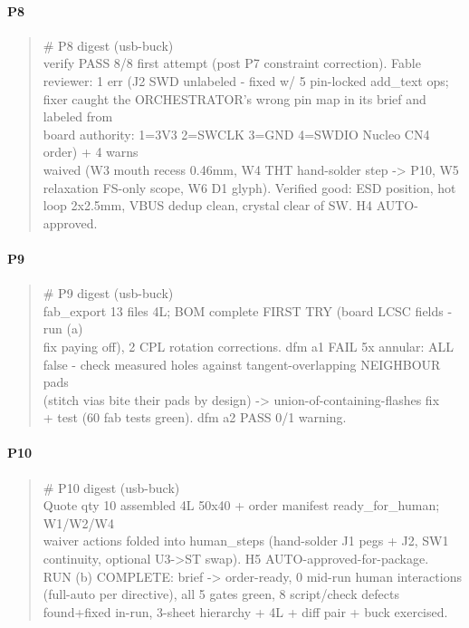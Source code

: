 \documentclass[11pt,a4paper]{article}
\begin{document}
\paragraph*{P8}
\begin{quote}\small\ttfamily\raggedright
\# P8 digest (usb-buck)\\
verify PASS 8/8 first attempt (post P7 constraint correction). Fable\\
reviewer: 1 err (J2 SWD unlabeled - fixed w/ 5 pin-locked add\_text ops;\\
fixer caught the ORCHESTRATOR's wrong pin map in its brief and labeled from\\
board authority: 1=3V3 2=SWCLK 3=GND 4=SWDIO Nucleo CN4 order) + 4 warns\\
waived (W3 mouth recess 0.46mm, W4 THT hand-solder step -\textgreater{} P10, W5\\
relaxation FS-only scope, W6 D1 glyph). Verified good: ESD position, hot\\
loop 2x2.5mm, VBUS dedup clean, crystal clear of SW. H4 AUTO-approved.
\end{quote}
\paragraph*{P9}
\begin{quote}\small\ttfamily\raggedright
\# P9 digest (usb-buck)\\
fab\_export 13 files 4L; BOM complete FIRST TRY (board LCSC fields - run (a)\\
fix paying off), 2 CPL rotation corrections. dfm a1 FAIL 5x annular: ALL\\
false - check measured holes against tangent-overlapping NEIGHBOUR pads\\
(stitch vias bite their pads by design) -\textgreater{} union-of-containing-flashes fix\\
+ test (60 fab tests green). dfm a2 PASS 0/1 warning.
\end{quote}
\paragraph*{P10}
\begin{quote}\small\ttfamily\raggedright
\# P10 digest (usb-buck)\\
Quote qty 10 assembled 4L 50x40 + order manifest ready\_for\_human; W1/W2/W4\\
waiver actions folded into human\_steps (hand-solder J1 pegs + J2, SW1\\
continuity, optional U3-\textgreater{}ST swap). H5 AUTO-approved-for-package.\\
RUN (b) COMPLETE: brief -\textgreater{} order-ready, 0 mid-run human interactions\\
(full-auto per directive), all 5 gates green, 8 script/check defects\\
found+fixed in-run, 3-sheet hierarchy + 4L + diff pair + buck exercised.
\end{quote}
\end{document}

